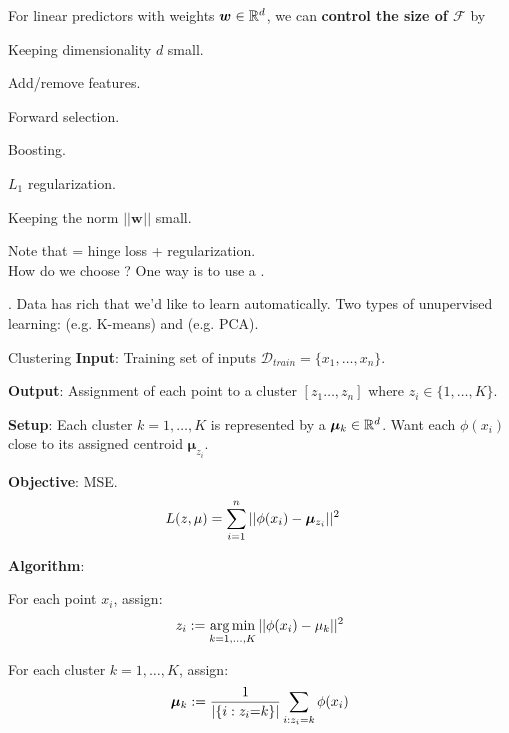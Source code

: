 \documentclass[11pt]{article}
\renewcommand\vec[2][]{\bm{#2}_{#1}}
\newcommand\myspace[1][]{\vspace{#1\bigskipamount}\Needspace{10\baselineskip}}
\newcommand\p{\Needspace{10\baselineskip} \noindent}
\begin{document}
For linear predictors with weights $\vec w \in \R^d$, we can \textbf{control the size of $\mathcal F$} by \textellipsis
\begin{compactitem}
	\item Keeping dimensionality $d$ small.
	\begin{compactitem}
		\item Add/remove features.
		\item Forward selection.
		\item Boosting.
		\item $L_1$ regularization.
	\end{compactitem}
	\item Keeping the norm $|| \vec w ||$ small.
\end{compactitem}
Note that  = hinge loss + regularization.\\

\p How do we choose  ? One way is to use a . 

\myspace 
\p {} . Data has rich  that we'd like to learn automatically. Two types of unupervised learning:  (e.g. K-means) and  (e.g. PCA). 

\begin{definition}{Clustering}
	\textbf{Input}: Training set of inputs $\mathcal{D}_{train} = \{ x_1, \ldots, x_n \}$.
	
	\textbf{Output}: Assignment of each point to a cluster $[ z_1 \ldots, z_n ]$ where $z_i \in \{1, \ldots, K\}$. 
\end{definition} 

\begin{algorithm}
	\textbf{Setup}: Each cluster $k = 1, \ldots, K  $ is represented by a  $\vec[k]{\mu} \in \R^d$. Want each $\phi(x_i)$ close to its assigned centroid $\vec[z_i]{\mu}$. 
	
	\textbf{Objective}: MSE. 
	\begin{align}
		L(z, \mu)
			&= \insum || \phi(x_i) - \vec[z_i]{\mu} ||^2
	\end{align}
	
	\textbf{Algorithm}:
	\begin{compactenum}
		\item For each point $x_i$, assign:
		\begin{align}
			z_i := \operatorname*{arg\,min}_{k=1,\ldots,K} ||\phi(x_i) - \mu_k||^2
		\end{align}
		
		\item For each cluster $k = 1, \ldots, K$, assign:
		\begin{align}
			\vec[k]{\mu} := \inv{| \{ i: z_i{=}k  \}   |}  \sum_{i: z_i{=}k} \phi(x_i)
		\end{align}
	\end{compactenum}
\end{algorithm}
\end{document}

